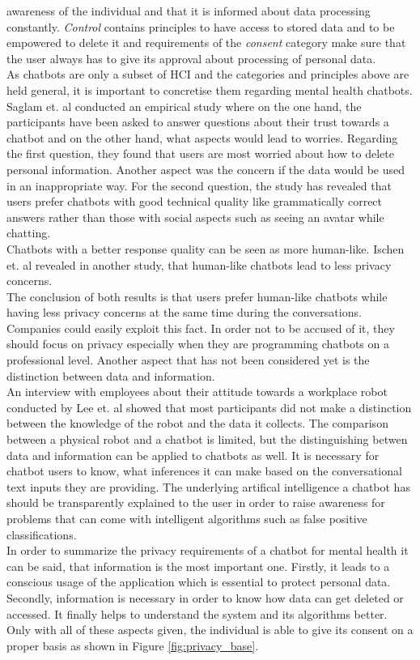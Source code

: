 \documentclass[sigconf, nonacm]{acmart}
\begin{document}
awareness of the individual and that it is informed about data processing constantly. \emph{Control} contains principles to have access to stored data and to be empowered to delete it and requirements of the \emph{consent} category make sure that the user always has to give its approval about processing of personal data.
\\
As chatbots are only a subset of HCI and the categories and principles above are held general, it is important to concretise them regarding mental health chatbots.
\\
Saglam et. al \cite{Shamim2021} conducted an empirical study where on the one hand, the participants have been asked to answer questions about their trust towards a chatbot and 
on the other hand, what aspects would lead to worries. Regarding the first question, they found that users are most worried about how to delete personal information. Another aspect was the concern if the data would be used in an inappropriate way. 
For the second question, the study has revealed that users prefer chatbots with good technical quality like grammatically correct answers rather than those with social aspects such as seeing an avatar while chatting.
\\
Chatbots with a better response quality can be seen as more human-like. Ischen et. al \cite{Ischen} revealed in another study, that human-like chatbots lead to less privacy concerns.
\\
The conclusion of both results is that users prefer human-like chatbots while having less privacy concerns at the same time during the conversations. Companies could easily exploit this fact. In order not to be accused of it, they should focus on privacy especially when they are programming chatbots on a professional level.  
Another aspect that has not been considered yet is the distinction between data and information.
\\
An interview with employees about their attitude towards a workplace robot conducted by Lee et. al \cite{Lee2011} showed that most participants did not make a distinction between the knowledge of the robot and the data it collects.
The comparison between a physical robot and a chatbot is limited, but the distinguishing betwen data and information can be applied to chatbots as well. It is necessary for chatbot users to know, what inferences it can make based on the conversational text inputs they are providing. The underlying artifical intelligence a chatbot has should be transparently explained 
to the user in order to raise awareness for problems that can come with intelligent algorithms such as false positive classifications.
\\
In order to summarize the privacy requirements of a chatbot for mental health it can be said, that information is the most important one. Firstly, it leads to a conscious usage of the application which is essential to protect personal data. Secondly, information is necessary in order to know how data can get deleted or accessed. It finally helps to understand the system and 
its algorithms better. Only with all of these aspects given, the individual is able to give its consent on a proper basis as shown in Figure \ref{fig:privacy_base}. 
\end{document}
